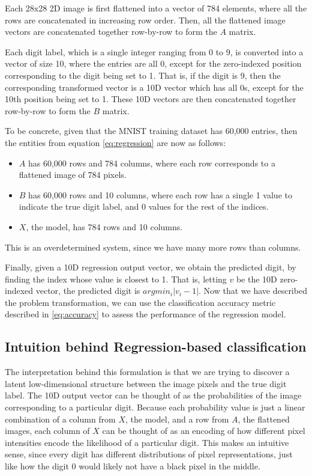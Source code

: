 \documentclass[letterpaper, 10 pt, conference]{ieeeconf}  %
\begin{document}
Each 28x28 2D image is first flattened into a vector of 784 elements, where all the rows are concatenated in increasing row order. Then, all the flattened image vectors are concatenated together row-by-row to form the $A$ matrix.

Each digit label, which is a single integer ranging from 0 to 9, is converted into a vector of size 10, where the entries are all 0, except for the zero-indexed position corresponding to the digit being set to 1. That is, if the digit is 9, then the corresponding transformed vector is a 10D vector which has all 0s, except for the 10th position being set to 1. These 10D vectors are then concatenated together row-by-row to form the $B$ matrix.

To be concrete, given that the MNIST training dataset has 60,000 entries, then the entities from equation \ref{eq:regression} are now as follows:
\begin{itemize}
    \item $A$ has 60,000 rows and 784 columns, where each row corresponds to a flattened image of 784 pixels.
    \item $B$ has 60,000 rows and 10 columns, where each row has a single 1 value to indicate the true digit label, and 0 values for the rest of the indices.
    \item $X$, the model, has 784 rows and 10 columns.
\end{itemize}
This is an overdetermined system, since we have many more rows than columns.

Finally, given a 10D regression output vector, we obtain the predicted digit, by finding the index whose value is closest to 1. That is, letting $v$ be the 10D zero-indexed vector, the predicted digit is $argmin_i {|v_i - 1|}$. Now that we have described the problem transformation, we can use the classification accuracy metric described in \ref{eq:accuracy} to assess the performance of the regression model.

\subsection{Intuition behind Regression-based classification}
The interpretation behind this formulation is that we are trying to discover a latent low-dimensional structure between the image pixels and the true digit label. The 10D output vector can be thought of as the probabilities of the image corresponding to a particular digit. Because each probability value is just a linear combination of a column from $X$, the model, and a row from $A$, the flattened images, each column of $X$ can be thought of as an encoding of how different pixel intensities encode the likelihood of a particular digit. This makes an intuitive sense, since every digit has different distributions of pixel representations, just like how the digit 0 would likely not have a black pixel in the middle. 
\end{document}

